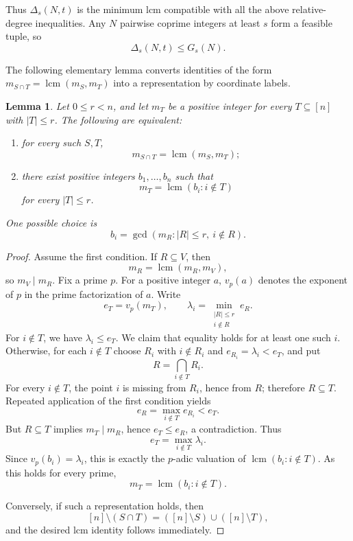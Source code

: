 \documentclass[11pt,onecolumn]{IEEEtran}
\newtheorem{lemma}{Lemma}
\newcommand{\lcmop}{\operatorname{lcm}}
\begin{document}
Thus $\Delta_s(N,t)$ is the minimum lcm compatible with all the above
relative-degree inequalities.  Any $N$ pairwise coprime integers at
least $s$ form a feasible tuple, so
\begin{equation}
\Delta_s(N,t)\le G_s(N).
\label{eq:Delta-G-basic}
\end{equation}

The following elementary lemma converts identities of the form
$m_{S\cap T}=\lcmop(m_S,m_T)$ into a representation by coordinate
labels.

\begin{lemma}
\label{lem:canonical-lcm-representation}
Let $0\le r<n$, and let $m_T$ be a positive integer for every
$T\subseteq[n]$ with $|T|\le r$.  The following are equivalent:
\begin{enumerate}
\item for every such $S,T$,
\[
m_{S\cap T}=\lcmop(m_S,m_T);
\]
\item there exist positive integers $b_1,\ldots,b_n$ such that
\[
m_T=\lcmop(b_i:i\notin T)
\]
for every $|T|\le r$.
\end{enumerate}
One possible choice is
\[
b_i=\gcd(m_R:|R|\le r,\ i\notin R).
\]
\end{lemma}

\begin{proof}
Assume the first condition.  If $R\subseteq V$, then
\[
m_R=\lcmop(m_R,m_V),
\]
so $m_V\mid m_R$.  Fix a prime $p$.
For a positive integer $a$, $v_p(a)$ denotes the
exponent of $p$ in the prime factorization of $a$. Write
\[
e_T=v_p(m_T),
\qquad
\lambda_i=\min_{\substack{|R|\le r\\ i\notin R}}e_R.
\]
For $i\notin T$, we have $\lambda_i\le e_T$.  We claim that equality
holds for at least one such $i$.  Otherwise, for each $i\notin T$ choose
$R_i$ with $i\notin R_i$ and $e_{R_i}=\lambda_i<e_T$, and put
\[
R=\mathop{\bigcap}\limits_{i\notin T}R_i.
\]
For every $i\notin T$, the point $i$ is missing from $R_i$, hence from
$R$; therefore $R\subseteq T$.  Repeated application of the first condition yields
\[
e_R=\max_{i\notin T}e_{R_i}<e_T.
\]
But $R\subseteq T$ implies $m_T\mid m_R$, hence $e_T\le e_R$, a
contradiction.  Thus
\[
e_T=\max_{i\notin T}\lambda_i.
\]
Since $v_p(b_i)=\lambda_i$, this is exactly the $p$-adic valuation
of $\lcmop(b_i:i\notin T)$.  As this holds for every prime,
\[
m_T=\lcmop(b_i:i\notin T).
\]

Conversely, if such a representation holds, then
\[
[n]\setminus(S\cap T)
=([n]\setminus S)\cup([n]\setminus T),
\]
and the desired lcm identity follows immediately.
\end{proof}
\end{document}
